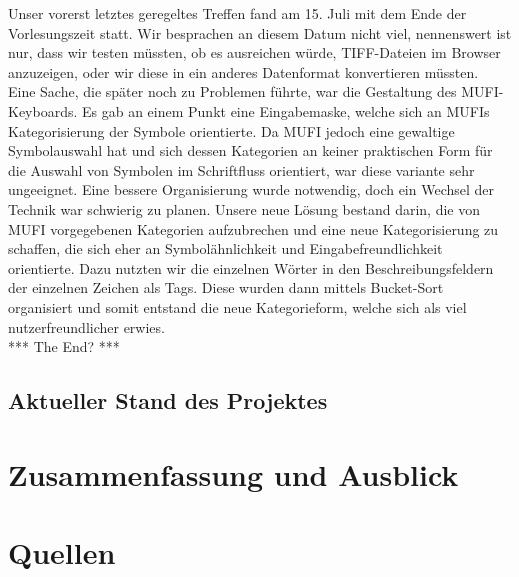 \documentclass{article}
\begin{document}
Unser vorerst letztes geregeltes Treffen fand am
15. Juli mit dem Ende der Vorlesungszeit statt.
Wir besprachen an diesem Datum nicht viel,
nennenswert ist nur,
dass wir testen müssten,
ob es ausreichen würde,
TIFF-Dateien im Browser anzuzeigen,
oder wir diese in ein anderes Datenformat konvertieren müssten. \\
Eine Sache,
die später noch zu Problemen führte,
war die Gestaltung des MUFI-Keyboards.
Es gab an einem Punkt eine Eingabemaske,
welche sich an MUFIs Kategorisierung der Symbole orientierte.
Da MUFI jedoch eine gewaltige Symbolauswahl hat und sich dessen Kategorien an
keiner praktischen Form für die Auswahl von Symbolen im Schriftfluss orientiert,
war diese variante sehr ungeeignet.
Eine bessere Organisierung wurde notwendig,
doch ein Wechsel der Technik war schwierig zu planen.
Unsere neue Lösung bestand darin,
die von MUFI vorgegebenen Kategorien aufzubrechen
und eine neue Kategorisierung zu schaffen,
die sich eher an Symbolähnlichkeit und Eingabefreundlichkeit orientierte.
Dazu nutzten wir die einzelnen Wörter in den
Beschreibungsfeldern der einzelnen Zeichen als Tags.
Diese wurden dann mittels Bucket-Sort organisiert
und somit entstand die neue Kategorieform,
welche sich als viel nutzerfreundlicher erwies. \\
*** The End? ***

\subsection{Aktueller Stand des Projektes}

\section{Zusammenfassung und Ausblick}

\section*{Quellen}
  \printbibliography[%
    heading=bibintoc, %
  ]
\end{document}
